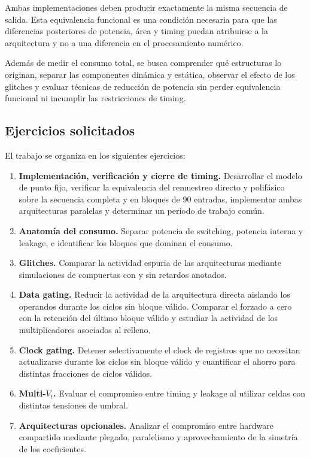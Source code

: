\documentclass[10pt,a4paper]{article}
\begin{document}
Ambas implementaciones deben producir exactamente la misma secuencia de salida.
Esta equivalencia funcional es una condición necesaria para que las diferencias
posteriores de potencia, área y timing puedan atribuirse a la arquitectura y no a
una diferencia en el procesamiento numérico.

Además de medir el consumo total, se busca comprender qué estructuras lo originan,
separar las componentes dinámica y estática, observar el efecto de los glitches y
evaluar técnicas de reducción de potencia sin perder equivalencia funcional ni
incumplir las restricciones de timing.

\subsection{Ejercicios solicitados}

El trabajo se organiza en los siguientes ejercicios:

\begin{enumerate}
    \item \textbf{Implementación, verificación y cierre de timing.} Desarrollar el
    modelo de punto fijo, verificar la equivalencia del remuestreo directo y
    polifásico sobre la secuencia completa y en bloques de 90 entradas, implementar
    ambas arquitecturas paralelas y determinar un período de trabajo común.

    \item \textbf{Anatomía del consumo.} Separar potencia de switching, potencia
    interna y leakage, e identificar los bloques que dominan el consumo.

    \item \textbf{Glitches.} Comparar la actividad espuria de las arquitecturas
    mediante simulaciones de compuertas con y sin retardos anotados.

    \item \textbf{Data gating.} Reducir la actividad de la arquitectura directa
    aislando los operandos durante los ciclos sin bloque válido. Comparar el
    forzado a cero con la retención del último bloque válido y estudiar la
    actividad de los multiplicadores asociados al relleno.

    \item \textbf{Clock gating.} Detener selectivamente el clock de registros que
    no necesitan actualizarse durante los ciclos sin bloque válido y cuantificar
    el ahorro para distintas fracciones de ciclos válidos.

    \item \textbf{Multi-$V_t$.} Evaluar el compromiso entre timing y leakage al
    utilizar celdas con distintas tensiones de umbral.

    \item \textbf{Arquitecturas opcionales.} Analizar el compromiso entre hardware
    compartido mediante plegado, paralelismo y aprovechamiento de la simetría
    de los coeficientes.
\end{enumerate}
\end{document}
